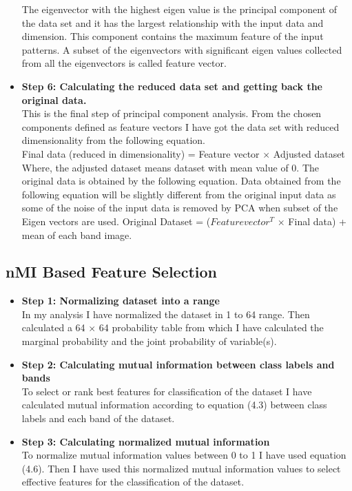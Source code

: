 \documentclass[document.tex]{subfiles}
\begin{document}
\begin{itemize}
	The eigenvector with the highest eigen value is the principal component of the
	data set and it has the largest relationship with the input data and dimension.
	This component contains the maximum feature of the input patterns. A subset of
	the eigenvectors with significant eigen values collected from all the eigenvectors is
	called feature vector.
	\item \textbf{ Step 6: Calculating the reduced data set and getting back the original
	data.}\\
	This is the final step of principal component analysis. From the chosen components
	defined as feature vectors I have got the data set with reduced dimensionality from
	the following equation.\\
	Final data (reduced in dimensionality) = Feature vector $\times$ Adjusted dataset\\
	Where, the adjusted dataset means dataset with mean value of 0. The original data
	is obtained by the following equation. Data obtained from the following equation
	will be slightly different from the original input data as some of the noise of the
	input data is removed by PCA when subset of the Eigen vectors are used. Original
	Dataset = ($Featurevector^T$ $\times$ Final data) + mean of each band image.
\end{itemize}

\subsection{nMI Based Feature Selection}
\begin{itemize}
	\item \textbf{Step 1: Normalizing dataset into a range}\\
	In my analysis I have normalized the dataset in 1 to 64 range. Then calculated a 64 $\times$ 64 probability table from which I have calculated the marginal probability and the joint probability of variable(s). 
	\item \textbf{Step 2: Calculating mutual information between class labels and bands}\\
	To select or rank best features for classification of the dataset I have calculated mutual information according to equation (4.3) between class labels and each band of the dataset.
	\item \textbf{Step 3: Calculating normalized mutual information}\\
	To normalize mutual information values between 0 to 1 I have used equation (4.6). Then I have used this normalized mutual information values to select effective features for the classification of the dataset. 
\end{itemize}
\end{document}
